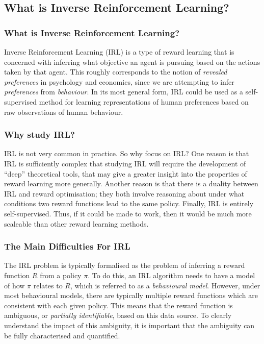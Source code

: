 \documentclass{beamer}
\begin{document}
\subsection{What is Inverse Reinforcement Learning?}

\begin{frame}
    \frametitle{What is Inverse Reinforcement Learning?}
    \small
    Inverse Reinforcement Learning (IRL) is a type of reward learning that is concerned with inferring what objective an agent is pursuing based on the actions taken by that agent.
    \newline\newline
    This roughly corresponds to the notion of \emph{revealed preferences} in psychology and economics, since we are attempting to infer \emph{preferences} from \emph{behaviour}.
    \newline\newline
    In its most general form, IRL could be used as a self-supervised method for learning representations of human preferences based on raw observations of human behaviour.
\end{frame}

\begin{frame}
    \frametitle{Why study IRL?}
    \small
    IRL is not very common in practice. So why focus on IRL?
    \newline\newline
    One reason is that IRL is sufficiently complex that studying IRL will require the development of \enquote{deep} theoretical tools, that may give a greater insight into the properties of reward learning more generally.
    \newline\newline
    Another reason is that there is a duality between IRL and reward optimisation; they both involve reasoning about under what conditions two reward functions lead to the same policy. 
    \newline\newline
    Finally, IRL is entirely self-supervised. Thus, if it could be made to work, then it would be much more scaleable than other reward learning methods.
\end{frame}

\begin{frame}
    \frametitle{The Main Difficulties For IRL}
    \small
     The IRL problem is typically formalised as the problem of inferring a reward function $R$ from a policy $\pi$. To do this, an IRL algorithm needs to have a model of how $\pi$ relates to $R$, which is referred to as a \emph{behavioural model}. 
     \newline\newline
     However, under most behavioural models, there are typically multiple reward functions which are consistent with each given policy. This means that the reward function is ambiguous, or \emph{partially identifiable}, based on this data source.
     \newline\newline
     To clearly understand the impact of this ambiguity, it is important that the ambiguity can be fully characterised and quantified.
\end{frame}
\end{document}
